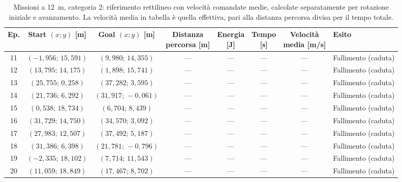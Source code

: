 \begin{table}[H]
\centering
\caption{Missioni a 12~m, categoria 2: riferimento rettilineo con velocità comandate medie, calcolate separatamente per rotazione iniziale e avanzamento. La velocità media in tabella è quella effettiva, pari alla distanza percorsa divisa per il tempo totale.}
\label{tab:straight-line-command-mean-12m-cat2}
\begingroup
\fontsize{9}{11}\selectfont
\setlength{\tabcolsep}{2.5pt}
\renewcommand{\arraystretch}{1.2}
\begin{tabular}{@{}c cc cccc l@{}}
\toprule
Ep. & \shortstack{Start $(x;y)$\\{}[m]} & \shortstack{Goal $(x;y)$\\{}[m]} & \shortstack{Distanza\\percorsa [m]} & \shortstack{Energia\\{}[J]} & \shortstack{Tempo\\{}[s]} & \shortstack{Velocità\\media [m/s]} & Esito \\
\midrule
11 & $(-1{,}956;\,15{,}591)$ & $(9{,}980;\,14{,}355)$ & --- & --- & --- & --- & Fallimento (caduta) \\
12 & $(13{,}795;\,14{,}175)$ & $(1{,}898;\,15{,}741)$ & --- & --- & --- & --- & Fallimento (caduta) \\
13 & $(25{,}755;\,0{,}258)$ & $(37{,}282;\,3{,}595)$ & --- & --- & --- & --- & Fallimento (caduta) \\
14 & $(21{,}736;\,6{,}292)$ & $(31{,}917;\,-0{,}061)$ & --- & --- & --- & --- & Fallimento (caduta) \\
15 & $(0{,}538;\,18{,}734)$ & $(6{,}704;\,8{,}439)$ & --- & --- & --- & --- & Fallimento (caduta) \\
16 & $(31{,}729;\,14{,}750)$ & $(34{,}570;\,3{,}092)$ & --- & --- & --- & --- & Fallimento (caduta) \\
17 & $(27{,}983;\,12{,}507)$ & $(37{,}492;\,5{,}187)$ & --- & --- & --- & --- & Fallimento (caduta) \\
18 & $(31{,}386;\,6{,}398)$ & $(21{,}781;\,-0{,}796)$ & --- & --- & --- & --- & Fallimento (caduta) \\
19 & $(-2{,}335;\,18{,}102)$ & $(7{,}714;\,11{,}543)$ & --- & --- & --- & --- & Fallimento (caduta) \\
20 & $(11{,}059;\,18{,}849)$ & $(17{,}467;\,8{,}702)$ & --- & --- & --- & --- & Fallimento (caduta) \\
\bottomrule
\end{tabular}
\endgroup
\end{table}

